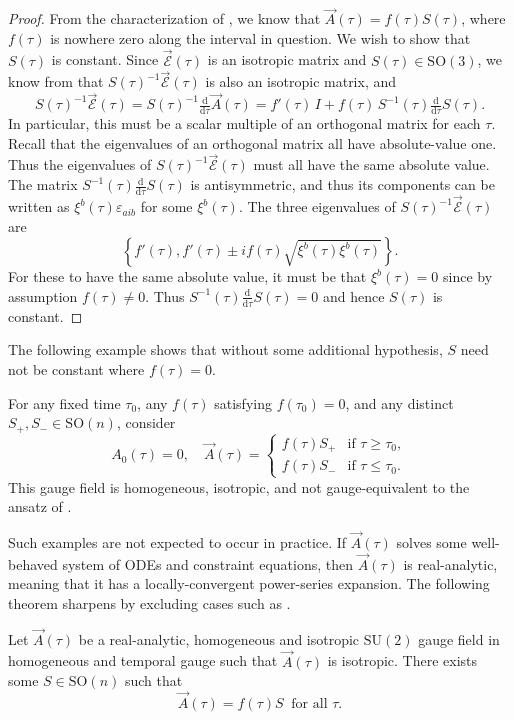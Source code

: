 \begin{proof}
From the characterization of , we know that $\vec{A}(\tau)=f(\tau)S(\tau)$, where $f(\tau)$ is nowhere zero along the interval in question. We wish to show that $S(\tau)$ is constant. Since $\vec{\mathcal{E}}(\tau)$ is an isotropic matrix and $S(\tau)\in\mathrm{SO}(3)$, we know from  that $S(\tau)^{-1}\vec{\mathcal{E}}(\tau)$ is also an isotropic matrix, and 
\[
S(\tau)^{-1}\vec{\mathcal{E}}(\tau)=S(\tau)^{-1}\tfrac{\mathrm{d}}{\mathrm{d}\tau}\vec{A}(\tau)=f'(\tau)\,I+f(\tau)\,S^{-1}(\tau)\tfrac{\mathrm{d}}{\mathrm{d}\tau}S(\tau).
\]
 In particular, this must be a scalar multiple of an orthogonal matrix for each $\tau$. Recall that the eigenvalues of an orthogonal matrix all have absolute-value one. Thus the eigenvalues of $S(\tau)^{-1}\vec{\mathcal{E}}(\tau)$ must all have the same absolute value. The matrix $S^{-1}(\tau)\tfrac{\mathrm{d}}{\mathrm{d}\tau}S(\tau)$ is antisymmetric, and thus its components can be written as $\xi^{b}(\tau)\varepsilon_{aib}$ for some $\xi^{b}(\tau)$. The three eigenvalues of $S(\tau)^{-1}\vec{\mathcal{E}}(\tau)$ are 
\[
\left\{ f'(\tau),f'(\tau)\pm if(\tau)\sqrt{\xi^{b}(\tau)\xi^{b}(\tau)}\right\} .
\]
 For these to have the same absolute value, it must be that $\xi^{b}(\tau)=0$ since by assumption $f(\tau)\neq0$. Thus $S^{-1}(\tau)\tfrac{\mathrm{d}}{\mathrm{d}\tau}S(\tau)=0$ and hence $S(\tau)$ is constant.
\end{proof}
The following example shows that without some additional hypothesis, $S$ need not be constant where $f(\tau)=0$.
\begin{example}
\label{exa:no-ansatz}For any fixed time $\tau_{0}$, any $f(\tau)$ satisfying $f(\tau_{0})=0$, and any distinct $S_{+},S_{-}\in\mathrm{SO}(n)$, consider 
\[
A_{0}(\tau)=0,\quad\vec{A}(\tau)=\begin{cases}
f(\tau)S_{+} & \textrm{if }\tau\geq\tau_{0},\\
f(\tau)S_{-} & \textrm{if }\tau\leq\tau_{0}.
\end{cases}
\]
 This gauge field is homogeneous, isotropic, and not gauge-equivalent to the ansatz of . 
\end{example}

Such examples are not expected to occur in practice. If $\vec{A}(\tau)$ solves some well-behaved system of ODEs and constraint equations, then $\vec{A}(\tau)$ is real-analytic, meaning that it has a locally-convergent power-series expansion. The following theorem sharpens  by excluding cases such as .
\begin{thm}
\label{thm:analytic}Let $\vec{A}(\tau)$ be a real-analytic, homogeneous and isotropic $\mathrm{SU}(2)$ gauge field in homogeneous and temporal gauge such that $\vec{A}(\tau)$ is isotropic. There exists some $S\in\mathrm{SO}(n)$ such that 
\begin{equation}
\vec{A}(\tau)=f(\tau)S\ \textrm{ for all }\tau.\label{eq:const-son}
\end{equation}
\end{thm}

